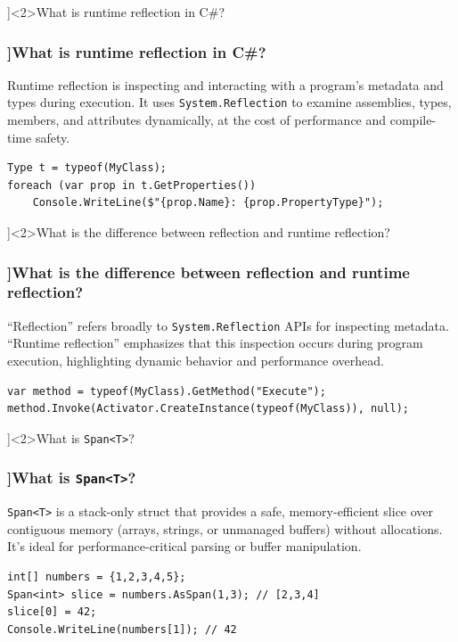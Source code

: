 \QuestionSlide[\CategoryBadge[MetaColor!20]{Metaprogramming}]<2>{What is runtime reflection in C\#?}
\begin{frame}[fragile]
  \frametitle{\AnswerTitle[\CategoryBadge[MetaColor!20]{Metaprogramming}]{What is runtime reflection in C\#?}}

  {\footnotesize
    Runtime reflection is inspecting and interacting with a program’s metadata and types during execution. It uses \texttt{System.Reflection} to examine assemblies, types, members, and attributes dynamically, at the cost of performance and compile-time safety.
  }

  \begin{verbatim}
Type t = typeof(MyClass);
foreach (var prop in t.GetProperties())
    Console.WriteLine($"{prop.Name}: {prop.PropertyType}");
  \end{verbatim}
\end{frame}

\QuestionSlide[\CategoryBadge[MetaColor!20]{Metaprogramming}]<2>{What is the difference between reflection and runtime reflection?}
\begin{frame}[fragile]
  \frametitle{\AnswerTitle[\CategoryBadge[MetaColor!20]{Metaprogramming}]{What is the difference between reflection and runtime reflection?}}

  {\footnotesize
    “Reflection” refers broadly to \texttt{System.Reflection} APIs for inspecting metadata. “Runtime reflection” emphasizes that this inspection occurs during program execution, highlighting dynamic behavior and performance overhead.
  }

  \begin{verbatim}
var method = typeof(MyClass).GetMethod("Execute");
method.Invoke(Activator.CreateInstance(typeof(MyClass)), null);
  \end{verbatim}
\end{frame}

\QuestionSlide[\CategoryBadge[PerfColor!20]{Performance}]<2>{What is \texttt{Span<T>}?}
\begin{frame}[fragile]
  \frametitle{\AnswerTitle[\CategoryBadge[PerfColor!20]{Performance}]{What is \texttt{Span<T>}?}}

  {\footnotesize
    \texttt{Span<T>} is a stack-only struct that provides a safe, memory-efficient slice over contiguous memory (arrays, strings, or unmanaged buffers) without allocations. It’s ideal for performance-critical parsing or buffer manipulation.
  }

  \begin{verbatim}
int[] numbers = {1,2,3,4,5};
Span<int> slice = numbers.AsSpan(1,3); // [2,3,4]
slice[0] = 42;
Console.WriteLine(numbers[1]); // 42
  \end{verbatim}
\end{frame}

